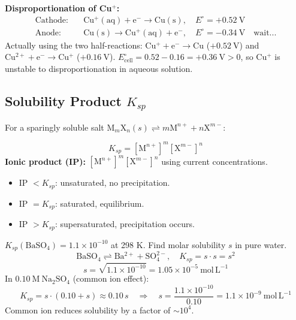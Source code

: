 \documentclass[12pt,a4paper]{article}
\begin{document}
\textbf{Disproportionation of Cu$^+$:}
\begin{align*}
\text{Cathode:}&\quad \mathrm{Cu^+(aq) + e^- \to Cu(s)},\quad E^\circ = +0.52\ \mathrm{V}\\
\text{Anode:}&\quad \mathrm{Cu(s) \to Cu^+(aq) + e^-},\quad E^\circ = -0.34\ \mathrm{V}\quad\text{wait...}
\end{align*}
Actually using the two half-reactions:
$\mathrm{Cu^+ + e^- \to Cu}$ ($+0.52\ \mathrm{V}$) and $\mathrm{Cu^{2+} + e^- \to Cu^+}$ ($+0.16\ \mathrm{V}$).
$E^\circ_{\mathrm{cell}} = 0.52 - 0.16 = +0.36\ \mathrm{V} > 0$, so Cu$^+$ is unstable to disproportionation in aqueous solution.

\subsection{Solubility Product \texorpdfstring{$K_{sp}$}{Ksp}}
For a sparingly soluble salt $\mathrm{M}_m\mathrm{X}_n(s) \rightleftharpoons m\mathrm{M}^{n+} + n\mathrm{X}^{m-}$:

\begin{tcolorbox}[formulabox, title={Solubility Product}]
\[
K_{sp} = [\mathrm{M}^{n+}]^m[\mathrm{X}^{m-}]^n
\]
\textbf{Ionic product (IP):} $[\mathrm{M}^{n+}]^m[\mathrm{X}^{m-}]^n$ using current concentrations.
\begin{itemize}[leftmargin=*, itemsep=1pt, topsep=2pt]
  \item IP $< K_{sp}$: unsaturated, no precipitation.
  \item IP $= K_{sp}$: saturated, equilibrium.
  \item IP $> K_{sp}$: supersaturated, precipitation occurs.
\end{itemize}
\end{tcolorbox}

\begin{tcolorbox}[examplebox, title={Solved Example: Solubility from \texorpdfstring{$K_{sp}$}{Ksp}}]
$K_{sp}(\mathrm{BaSO_4}) = 1.1\times10^{-10}$ at 298 K. Find molar solubility $s$ in pure water.
\[
\mathrm{BaSO_4 \rightleftharpoons Ba^{2+} + SO_4^{2-}},\quad K_{sp} = s\cdot s = s^2
\]
\[
s = \sqrt{1.1\times10^{-10}} = 1.05\times10^{-5}\ \mathrm{mol\,L^{-1}}
\]
In $0.10\ \mathrm{M}\ \mathrm{Na_2SO_4}$ (common ion effect):
\[
K_{sp} = s\cdot(0.10 + s) \approx 0.10\,s \quad\Rightarrow\quad s = \frac{1.1\times10^{-10}}{0.10} = 1.1\times10^{-9}\ \mathrm{mol\,L^{-1}}
\]
Common ion reduces solubility by a factor of $\sim 10^4$.
\end{tcolorbox}
\end{document}
